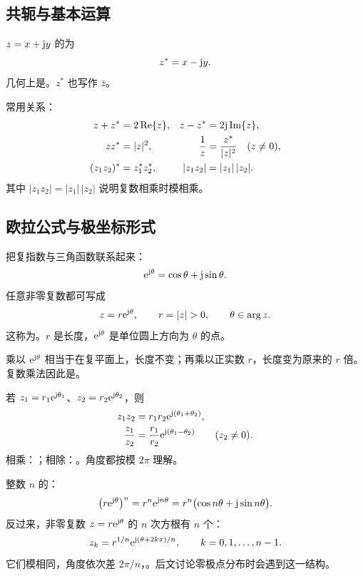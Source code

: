 \subsection{共轭与基本运算}

\begin{definition}[复共轭]
  $z=x+\mathrm{j} y$ 的为
  \[
    z^*=x-\mathrm{j} y.
  \]
  几何上是。$z^*$ 也写作 $\bar z$。
\end{definition}

常用关系：
\begin{align*}
  z+z^*&=2\operatorname{Re}\{z\},
  &z-z^*&=2\mathrm{j}\operatorname{Im}\{z\},\\
  zz^*&=|z|^2,
  &\frac{1}{z}&=\frac{z^*}{|z|^2}\quad(z\ne0),\\
  (z_1z_2)^*&=z_1^*z_2^*,
  &|z_1z_2|&=|z_1|\,|z_2|.
\end{align*}
其中 $|z_1z_2|=|z_1|\,|z_2|$ 说明复数相乘时模相乘。

\subsection{欧拉公式与极坐标形式}

把复指数与三角函数联系起来：
\begin{equation}
  \mathrm{e}^{\mathrm{j}\theta}=\cos\theta+\mathrm{j}\sin\theta.
  \label{eq:euler-formula}
\end{equation}
任意非零复数都可写成
\begin{equation}
  z=r\e^{\iu\theta},
  \qquad r=|z|>0,
  \qquad \theta\in\arg z.
  \label{eq:complex-polar-form}
\end{equation}
这称为。$r$ 是长度，$\mathrm{e}^{\mathrm{j}\theta}$ 是单位圆上方向为 $\theta$ 的点。

乘以 $\mathrm{e}^{\mathrm{j}\theta}$ 相当于在复平面上，长度不变；再乘以正实数 $r$，长度变为原来的 $r$ 倍。复数乘法因此是。

若 $z_1=r_1\mathrm{e}^{\mathrm{j}\theta_1}$、$z_2=r_2\mathrm{e}^{\mathrm{j}\theta_2}$，则
\begin{align*}
  z_1z_2&=r_1r_2\mathrm{e}^{\mathrm{j}(\theta_1+\theta_2)},\\
  \frac{z_1}{z_2}&=\frac{r_1}{r_2}\mathrm{e}^{\mathrm{j}(\theta_1-\theta_2)}
  \qquad(z_2\ne0).
\end{align*}
相乘：；相除：。角度都按模 $2\pi$ 理解。

整数 $n$ 的：
\[
  \bigl(r\mathrm{e}^{\mathrm{j}\theta}\bigr)^n
  =r^n\mathrm{e}^{\mathrm{j} n\theta}
  =r^n\bigl(\cos n\theta+\mathrm{j}\sin n\theta\bigr).
\]
反过来，非零复数 $z=r\mathrm{e}^{\mathrm{j}\theta}$ 的 $n$ 次方根有 $n$ 个：
\begin{equation}
  z_k=r^{1/n}\mathrm{e}^{\mathrm{j}(\theta+2k\pi)/n},
  \qquad k=0,1,\ldots,n-1.
  \label{eq:complex-nth-roots}
\end{equation}
它们模相同，角度依次差 $2\pi/n$，。后文讨论零极点分布时会遇到这一结构。

